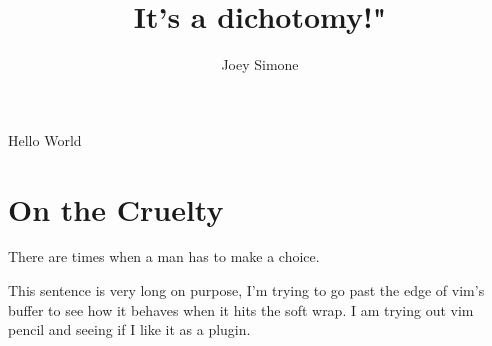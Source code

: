 \documentclass{article}
\title{It's a dichotomy!"}
\author{Joey Simone}
\begin{document}
\maketitle
Hello World
\section{On the Cruelty}
There are times when a man has to make a choice.

This sentence is very long on purpose, I'm trying to go past the edge of vim's buffer to see how it behaves when it hits the soft wrap. I am trying out vim pencil and seeing if I like it as a plugin.
\end{document}
